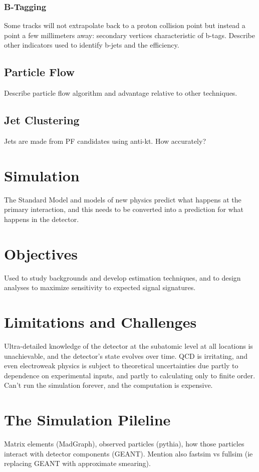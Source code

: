     \subsubsection{B-Tagging} \label{sec:btagging}

    Some tracks will not extrapolate back to a proton collision point but instead a point a few millimeters away: secondary vertices characteristic of b-tags.
    Describe other indicators used to identify b-jets and the efficiency.

  \subsection{Particle Flow} \label{sec:particleflow}

  Describe particle flow algorithm and advantage relative to other techniques.

  \subsection{Jet Clustering} \label{sec:jetclustering}

  Jets are made from PF candidates using anti-kt.
  How accurately?

\section{Simulation} \label{sec:simulation}

  The Standard Model and models of new physics predict what happens at the primary interaction, and this needs to be converted into a prediction for what happens in the detector.

  \section{Objectives} \label{sec:objectives}

  Used to study backgrounds and develop estimation techniques, and to design analyses to maximize sensitivity to expected signal signatures.

  \section{Limitations and Challenges} \label{sec:limitations}

  Ultra-detailed knowledge of the detector at the subatomic level at all locations is unachievable, and the detector's state evolves over time.
  QCD is irritating, and even electroweak physics is subject to theoretical uncertainties due partly to dependence on experimental inputs, and partly to calculating only to finite order.
  Can't run the simulation forever, and the computation is expensive.

  \section{The Simulation Pileline} \label{sec:pipeline}

  Matrix elements (MadGraph), observed particles (pythia), how those particles interact with detector components (GEANT).
  Mention also fastsim vs fullsim (ie replacing GEANT with approximate smearing).
